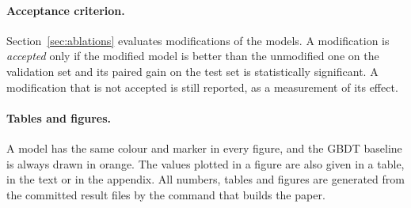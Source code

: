 \ifpairs
\paragraph{Acceptance criterion.}
Section~\ref{sec:ablations} evaluates modifications of the models. A
modification is \emph{accepted} only if the modified model is better than the
unmodified one on the validation set and its paired gain on the test set is
statistically significant. A modification that is not accepted is still
reported, as a measurement of its effect.
\fi

\paragraph{Tables and figures.}
A model has the same colour and marker in every figure, and the GBDT baseline
is always drawn in orange. The values plotted in a figure are also given in a
table, in the text or in the appendix. All numbers, tables and figures are
generated from the committed result files by the command that builds the
paper.
